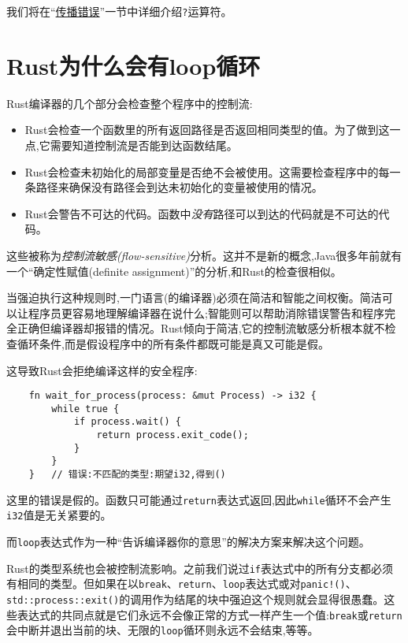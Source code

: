 我们将在“\hyperref[properror]{传播错误}”一节中详细介绍\texttt{?}运算符。

\section{Rust为什么会有loop循环}

Rust编译器的几个部分会检查整个程序中的控制流:
\begin{itemize}
    \item Rust会检查一个函数里的所有返回路径是否返回相同类型的值。为了做到这一点,它需要知道控制流是否能到达函数结尾。
    \item Rust会检查未初始化的局部变量是否绝不会被使用。这需要检查程序中的每一条路径来确保没有路径会到达未初始化的变量被使用的情况。
    \item Rust会警告不可达的代码。函数中\emph{没有}路径可以到达的代码就是不可达的代码。
\end{itemize}

这些被称为\emph{控制流敏感(flow-sensitive)}分析。这并不是新的概念,Java很多年前就有一个“确定性赋值(definite assignment)”的分析,和Rust的检查很相似。

当强迫执行这种规则时,一门语言(的编译器)必须在简洁和智能之间权衡。简洁可以让程序员更容易地理解编译器在说什么;智能则可以帮助消除错误警告和程序完全正确但编译器却报错的情况。Rust倾向于简洁,它的控制流敏感分析根本就不检查循环条件,而是假设程序中的所有条件都既可能是真又可能是假。

这导致Rust会拒绝编译这样的安全程序:
\begin{verbatim}
    fn wait_for_process(process: &mut Process) -> i32 {
        while true {
            if process.wait() {
                return process.exit_code();
            }
        }
    }   // 错误:不匹配的类型:期望i32,得到()
\end{verbatim}

这里的错误是假的。函数只可能通过\texttt{return}表达式返回,因此\texttt{while}循环不会产生\texttt{i32}值是无关紧要的。

而\texttt{loop}表达式作为一种“告诉编译器你的意思”的解决方案来解决这个问题。

Rust的类型系统也会被控制流影响。之前我们说过\texttt{if}表达式中的所有分支都必须有相同的类型。但如果在以\texttt{break}、\texttt{return}、\texttt{loop}表达式或对\texttt{panic!()}、\texttt{std::process::exit()}的调用作为结尾的块中强迫这个规则就会显得很愚蠢。这些表达式的共同点就是它们永远不会像正常的方式一样产生一个值:\texttt{break}或\texttt{return}会中断并退出当前的块、无限的\texttt{loop}循环则永远不会结束,等等。

